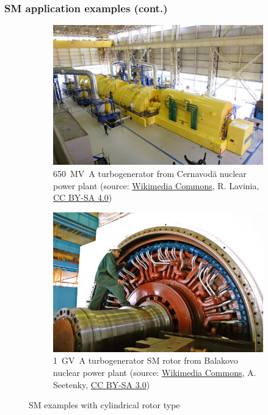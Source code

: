 \begin{frame}
	\frametitle{SM application examples (cont.)}
	\begin{figure}
		\centering
		\begin{subfigure}{0.49\textwidth}
			\centering
			\includegraphics[height=0.55\textheight]{fig/lec07/Turbogenerator.jpg}
			\caption{\SI{650}{\mega\volt\ampere} turbogenerator from Cernavodă nuclear power plant (source: \href{https://commons.wikimedia.org/wiki/File:Grupul_turbogenerator_CNE_Cernavoda.jpg}{Wikimedia Commons}, R. Lavinia, \href{https://creativecommons.org/licenses/by-sa/4.0/deed}{CC BY-SA 4.0})}
		\end{subfigure}
		\hfill
		\begin{subfigure}{0.49\textwidth}
			\centering
			\includegraphics[height=0.55\textheight]{fig/lec07/Turbogenerator_rotor.jpg}
			\caption{\SI[tight-spacing=true]{1}{\giga\volt\ampere} turbogenerator SM rotor from Balakovo nuclear power plant (source: \href{https://commons.wikimedia.org/wiki/File:BalakovoNPP_tb.jpg}{Wikimedia Commons},  A. Seetenky, \href{https://creativecommons.org/licenses/by-sa/3.0/deed}{CC BY-SA 3.0})} 
		\end{subfigure}
        \caption{SM examples with cylindrical rotor type} 
        \label{fig:examples_SM_applications_02}
	\end{figure}
\end{frame}

